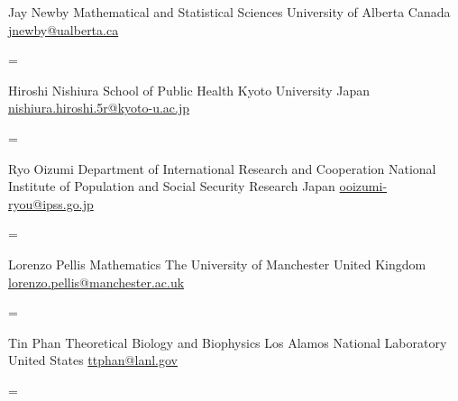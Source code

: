 \documentclass[
  letterpaper,
  DIV=11,
  numbers=noendperiod]{scrartcl}
\newenvironment{absolutelynopagebreak}
  {\par\nobreak\vfil\penalty0\vfilneg
   \vtop\bgroup}
  {\par\xdef\tpd{\the\prevdepth}\egroup
   \prevdepth=\tpd}
\begin{document}
\begin{absolutelynopagebreak}Jay   Newby \newline
\mbox{}\quad  Mathematical and Statistical Sciences \newline
\mbox{}\quad  University of Alberta \newline
\mbox{}\quad  Canada \newline
\mbox{}\quad \href{mailto: jnewby@ualberta.ca }{ jnewby@ualberta.ca }
\end{absolutelynopagebreak}\vskip0.2cm
\begin{absolutelynopagebreak}Hiroshi   Nishiura \newline
\mbox{}\quad  School of Public Health \newline
\mbox{}\quad  Kyoto University \newline
\mbox{}\quad  Japan \newline
\mbox{}\quad \href{mailto: nishiura.hiroshi.5r@kyoto-u.ac.jp }{ nishiura.hiroshi.5r@kyoto-u.ac.jp }
\end{absolutelynopagebreak}\vskip0.2cm
\begin{absolutelynopagebreak}Ryo   Oizumi \newline
\mbox{}\quad  Department of International Research and Cooperation \newline
\mbox{}\quad  National Institute of Population and Social Security Research \newline
\mbox{}\quad  Japan \newline
\mbox{}\quad \href{mailto: ooizumi-ryou@ipss.go.jp }{ ooizumi-ryou@ipss.go.jp }
\end{absolutelynopagebreak}\vskip0.2cm
\begin{absolutelynopagebreak}Lorenzo   Pellis \newline
\mbox{}\quad  Mathematics \newline
\mbox{}\quad  The University of Manchester \newline
\mbox{}\quad  United Kingdom \newline
\mbox{}\quad \href{mailto: lorenzo.pellis@manchester.ac.uk }{ lorenzo.pellis@manchester.ac.uk }
\end{absolutelynopagebreak}\vskip0.2cm
\begin{absolutelynopagebreak}Tin   Phan \newline
\mbox{}\quad  Theoretical Biology and Biophysics \newline
\mbox{}\quad  Los Alamos National Laboratory \newline
\mbox{}\quad  United States \newline
\mbox{}\quad \href{mailto: ttphan@lanl.gov }{ ttphan@lanl.gov }
\end{absolutelynopagebreak}\vskip0.2cm
\end{document}
